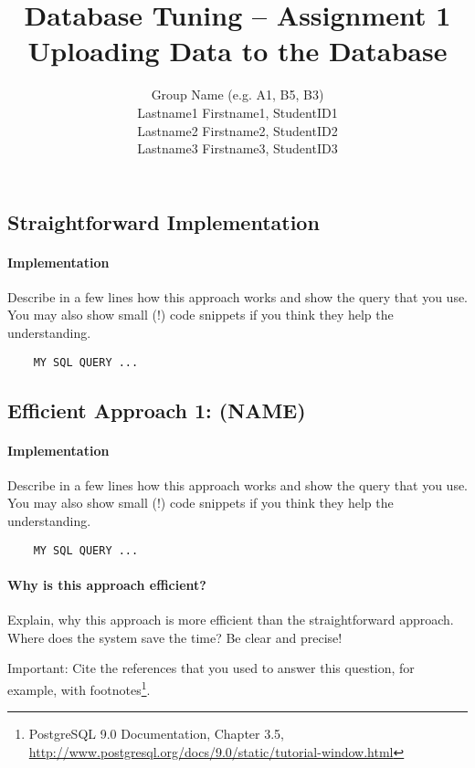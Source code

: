 \documentclass[11pt]{scrartcl}
\title{
  \textbf{\large Database Tuning -- Assignment 1}\\
  Uploading Data to the Database
}
\author{
 Group Name (e.g. A1, B5, B3)\\
 \large Lastname1 Firstname1, StudentID1 \\
 \large Lastname2 Firstname2, StudentID2 \\
 \large Lastname3 Firstname3, StudentID3 
}
\begin{document}
\maketitle

\subsection*{Straightforward Implementation}

  \paragraph{Implementation}

  Describe in a few lines how this approach works and show the query
  that you use. You may also show small (!) code snippets if you think
  they help the understanding.

{\small
\begin{verbatim}
    MY SQL QUERY ...
\end{verbatim}
}

  \subsection*{Efficient Approach 1: (NAME)}

  \paragraph{Implementation}

  Describe in a few lines how this approach works and show the query
  that you use. You may also show small (!) code snippets if you think
  they help the understanding.


{\small
\begin{verbatim}
    MY SQL QUERY ...
\end{verbatim}
}

  \paragraph{Why is this approach efficient?}

  Explain, why this approach is more efficient than the
  straightforward approach. Where does the system save the time? Be
  clear and precise!
  
  Important: Cite the references that you used to answer this
  question, for example, with footnotes\footnote{PostgreSQL 9.0
    Documentation, Chapter 3.5,
    \url{http://www.postgresql.org/docs/9.0/static/tutorial-window.html}}.
\end{document}
